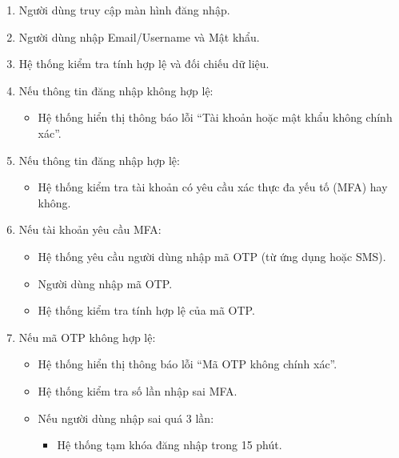 \begin{enumerate}
    \item Người dùng truy cập màn hình đăng nhập.
    
    \item Người dùng nhập Email/Username và Mật khẩu.
    
    \item Hệ thống kiểm tra tính hợp lệ và đối chiếu dữ liệu.

    \item Nếu thông tin đăng nhập không hợp lệ:
    \begin{itemize}
        \item Hệ thống hiển thị thông báo lỗi ``Tài khoản hoặc mật khẩu không chính xác''.
    \end{itemize}

    \item Nếu thông tin đăng nhập hợp lệ:
    \begin{itemize}
        \item Hệ thống kiểm tra tài khoản có yêu cầu xác thực đa yếu tố (MFA) hay không.
    \end{itemize}

    \item Nếu tài khoản yêu cầu MFA:
    \begin{itemize}
        \item Hệ thống yêu cầu người dùng nhập mã OTP (từ ứng dụng hoặc SMS).
        
        \item Người dùng nhập mã OTP.
        
        \item Hệ thống kiểm tra tính hợp lệ của mã OTP.
    \end{itemize}

    \item Nếu mã OTP không hợp lệ:
    \begin{itemize}
        \item Hệ thống hiển thị thông báo lỗi ``Mã OTP không chính xác''.
        
        \item Hệ thống kiểm tra số lần nhập sai MFA.
        
        \item Nếu người dùng nhập sai quá 3 lần:
        \begin{itemize}
            \item Hệ thống tạm khóa đăng nhập trong 15 phút.
        \end{itemize}
        

\end{itemize}
\end{enumerate}
